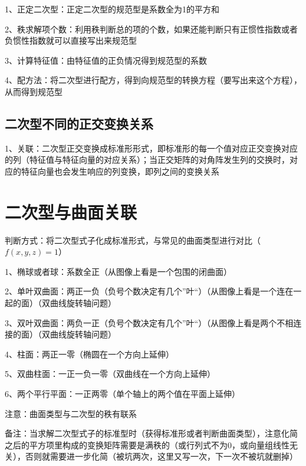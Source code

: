 1、正定二次型：正定二次型的规范型是系数全为1的平方和

2、秩求解项个数：利用秩判断总的项的个数，如果还能判断只有正惯性指数或者负惯性指数就可以直接写出来规范型

3、计算特征值：由特征值的正负情况得到规范型的系数

4、配方法：将二次型进行配方，得到向规范型的转换方程（要写出来这个方程），从而得到规范型



\subsection{二次型不同的正交变换关系}

1、关联：二次型正交变换成标准形形式，即标准形的每一个值对应正交变换对应的列（特征值与特征向量的对应关系）；当正交矩阵的对角阵发生列的交换时，对应的特征向量也会发生响应的列变换，即列之间的变换关系

\section{二次型与曲面关联}

判断方式：将二次型式子化成标准形式，与常见的曲面类型进行对比（$f(x,y,z)=1$）

1、椭球或者球：系数全正（从图像上看是一个包围的闭曲面）

2、单叶双曲面：两正一负（负号个数决定有几个”叶“）（从图像上看是一个连在一起的面）（双曲线旋转轴问题）

3、双叶双曲面：两负一正（负号个数决定有几个”叶“）（从图像上看是两个不相连接的面）（双曲线旋转轴问题）

4、柱面：两正一零（椭圆在一个方向上延伸）

5、双曲柱面：一正一负一零（双曲线在一个方向上延伸）

6、两个平行平面：一正两零（单个轴上的两个值在平面上延伸）

注意：曲面类型与二次型的秩有联系

备注：当求解二次型式子的标准型时（获得标准形或者判断曲面类型），注意化简之后的平方项里构成的变换矩阵需要是满秩的（或行列式不为0，或向量组线性无关），否则就需要进一步化简（被坑两次，这里又写一次，下一次不被坑就删掉）


